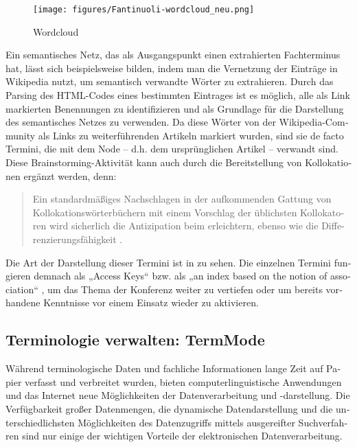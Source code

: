 \documentclass[output=paper]{LSP/langsci}
\begin{document}
\begin{otherlanguage}{ngerman}
\begin{figure}
\texttt{[image: figures/Fantinuoli-wordcloud\_neu.png]}
\caption{Wordcloud}
\label{fig:fantinuoli:4}
\end{figure} 

Ein semantisches Netz, das als Ausgangspunkt einen extrahierten Fachterminus hat, lässt sich beispielsweise bilden, indem man die Vernetzung der Einträge in Wikipedia nutzt, um semantisch verwandte Wörter zu extrahieren. Durch das Parsing des HTML-Codes eines bestimmten Eintrages ist es möglich, alle als Link markierten Benennungen zu identifizieren und als Grundlage für die Darstellung des semantisches Netzes zu verwenden. Da diese Wörter von der Wikipedia-Community als Links zu weiterführenden Artikeln markiert wurden, sind sie de facto Termini, die mit dem Node -- d.h. dem ursprünglichen Artikel -- verwandt sind. Diese Brainstorming-Aktivität kann auch durch die Bereitstellung von Kollokationen ergänzt werden, denn: 

\begin{quote}
\begin{addmargin}[3mm]{1em} %
{\sloppy
Ein standardmäßiges Nachschlagen in der aufkommenden Gattung von Kollokationswörterbüchern mit einem Vorschlag der üblichsten Kollokatoren wird sicherlich die Antizipation beim  erleichtern, ebenso wie die Differenzierungsfähigkeit \citep[58]{Stoll2009}.
}
\end{addmargin}
\end{quote}

Die Art der Darstellung dieser Termini ist in  zu sehen. Die einzelnen Termini fungieren demnach als „Access Keys“ bzw. als „an index based on the notion of association“  \citep[201]{Zock2010}, um das Thema der Konferenz weiter zu vertiefen oder um bereits vorhandene Kenntnisse vor einem Einsatz wieder zu aktivieren.

\subsection{Terminologie verwalten: TermMode}\label{sec:fantinuoli:6.2}

Während terminologische Daten und fachliche Informationen lange Zeit auf Papier verfasst und verbreitet wurden, bieten computerlinguistische Anwendungen und das Internet neue Möglichkeiten der Datenverarbeitung und -dar\-stel\-lung. Die Verfügbarkeit großer Datenmengen, die dynamische Datendarstellung und die unterschiedlichsten Möglichkeiten des Datenzugriffs mittels ausgereifter Suchverfahren sind nur einige der wichtigen Vorteile der elektronischen Datenverarbeitung.


\end{otherlanguage}
\end{document}
